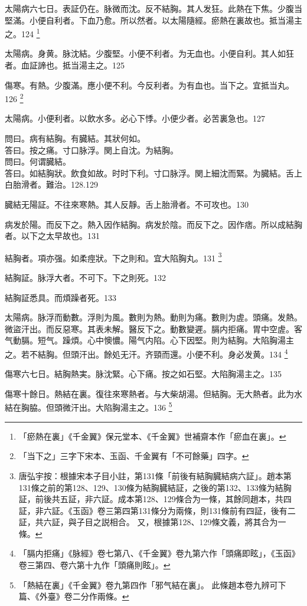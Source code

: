太陽病六七日。表証仍在。脉微而沈。反不結胸。其人发狂。此熱在下焦。少腹当堅滿。小便自利者。下血乃愈。所以然者。以太陽隨經。瘀熱在裏故也。抵当湯主之。124
	\footnote{
		「瘀熱在裏」《千金翼》保元堂本、《千金翼》世補齋本作「瘀血在裏」。
	}

太陽病。身黄。脉沈結。少腹堅。小便不利者。为无血也。小便自利。其人如狂者。血証諦也。抵当湯主之。125

傷寒。有熱。少腹滿。應小便不利。今反利者。为有血也。当下之。宜抵当丸。126
	\footnote{
		「当下之」三字下宋本、玉函、千金翼有「不可餘藥」四字。
	}

太陽病。小便利者。以飲水多。必心下悸。小便少者。必苦裏急也。127

問曰。病有結胸。有臓結。其狀何如。\\
答曰。按之痛。寸口脉浮。関上自沈。为結胸。\\
問曰。何谓臓結。\\
答曰。如結胸狀。飲食如故。时时下利。寸口脉浮。関上細沈而緊。为臓結。舌上白胎滑者。難治。128.129

臓結无陽証。不往來寒熱。其人反靜。舌上胎滑者。不可攻也。130

病发於陽。而反下之。熱入因作結胸。病发於陰。而反下之。因作痞。所以成結胸者。以下之太早故也。131

結胸者。項亦强。如柔痙狀。下之則和。宜大陷胸丸。131
	\footnote{
		唐弘宇按：根據宋本子目小註，第131條「前後有結胸臓結病六証」。趙本第131條之前的第128、129、130條为結胸臓結証，之後的第132、133條为結胸証，前後共五証，非六証。成本第128、129條合为一條，其餘同趙本，共四証，非六証。《玉函》卷三第四第131條分为兩條，則131條前有四証，後有二証，共六証，與子目之説相合。
		又，根據第128、129條文義，將其合为一條。
	}

結胸証。脉浮大者。不可下。下之則死。132

結胸証悉具。而煩躁者死。133

太陽病。脉浮而動數。浮則为風。數則为熱。動則为痛。數則为虗。頭痛。发熱。微盜汗出。而反惡寒。其表未解。醫反下之。動數變遲。膈内拒痛。胃中空虗。客气動膈。短气。躁煩。心中懊憹。陽气内陷。心下因堅。則为結胸。大陷胸湯主之。若不結胸。但頭汗出。餘処无汗。齐頸而還。小便不利。身必发黄。134
	\footnote{
		「膈内拒痛」《脉經》卷七第八、《千金翼》卷九第六作「頭痛即眩」，《玉函》卷三第四、卷六第十九作「頭痛則眩」。
	}

傷寒六七日。結胸熱実。脉沈緊。心下痛。按之如石堅。大陷胸湯主之。135

傷寒十餘日。熱結在裏。復往來寒熱者。与大柴胡湯。但結胸。无大熱者。此为水結在胸脇。{\khaaitp 但}頭微汗出。大陷胸湯主之。136
	\footnote{
		「熱結在裏」《千金翼》卷九第四作「邪气結在裏」。
		此條趙本卷九辨可下篇、《外臺》卷二分作兩條。
	}

